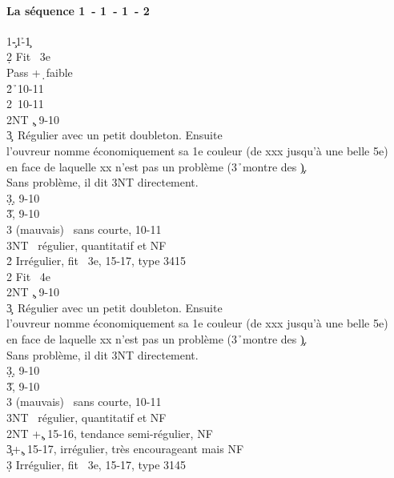 \documentclass[a4paper]{article}
\begin{document}
\paragraph{La séquence 1\pdfc\ - 1\pdfh\ - 1\pdfs\ - 2\pdfc}

\begin{bidtable}
1\c-1\h-1\c\+\\
2\d \> Fit \s\ 3e\+\\
Pass +\d\ faible\\
2\h {}\h\ 10-11\\
2\s {}\s\ 10-11\\
2NT \c , 9-10\\
3\c {}\s\ Régulier avec un petit doubleton. Ensuite\\
\>l'ouvreur nomme économiquement sa 1e couleur (de xxx jusqu'à une belle 5e)\\
\>en face de laquelle xx n'est pas un problème (3\h\ montre des \c ). \\
\>Sans problème, il dit 3NT directement.\\
3\d {}\d , 9-10\\
3\h {}\h , 9-10\\
3\s {} (mauvais) \s\ sans courte, 10-11\\
3NT \s\ régulier, quantitatif et NF\-\\
2\h \> Irrégulier, fit \s\ 3e, 15-17, type 3415\\
2\s \> Fit \s\ 4e\+\\
2NT \c , 9-10\\
3\c {}\s\ Régulier avec un petit doubleton. Ensuite\\
\>l'ouvreur nomme économiquement sa 1e couleur (de xxx jusqu'à une belle 5e)\\
\>en face de laquelle xx n'est pas un problème (3\h\ montre des \c ). \\
\>Sans problème, il dit 3NT directement.\\
3\d {}\d , 9-10\\
3\h {}\h , 9-10\\
3\s {} (mauvais) \s\ sans courte, 10-11\\
3NT \s\ régulier, quantitatif et NF\-\\
2NT +\c , 15-16, tendance semi-régulier, NF\\
3\c {}+\c , 15-17, irrégulier, très encourageant mais NF\\
3\d \> Irrégulier, fit \s\ 3e, 15-17, type 3145\-
\end{bidtable}
\end{document}

